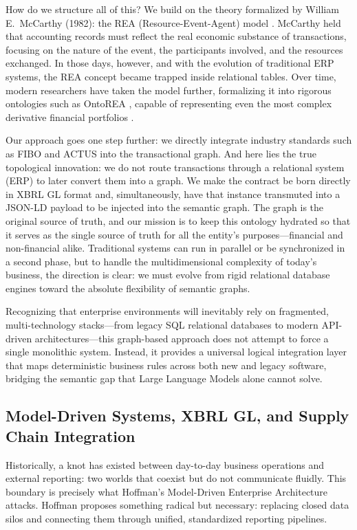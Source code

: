 \documentclass[12pt, a4paper]{article}
\begin{document}
How do we structure all of this? We build on the theory formalized by William E.~McCarthy (1982): the REA (Resource-Event-Agent) model \cite{mccarthy1982}. McCarthy held that accounting records must reflect the real economic substance of transactions, focusing on the nature of the event, the participants involved, and the resources exchanged. In those days, however, and with the evolution of traditional ERP systems, the REA concept became trapped inside relational tables. Over time, modern researchers have taken the model further, formalizing it into rigorous ontologies such as OntoREA \cite{fischerpauzenberger2017}, capable of representing even the most complex derivative financial portfolios \cite{fischerpauzenberger2018}.

Our approach goes one step further: we directly integrate industry standards such as FIBO \cite{edmc2020} and ACTUS \cite{actus2018} into the transactional graph. And here lies the true topological innovation: we do not route transactions through a relational system (ERP) to later convert them into a graph. We make the contract be born directly in XBRL GL format and, simultaneously, have that instance transmuted into a JSON-LD payload to be injected into the semantic graph. The graph is the original source of truth, and our mission is to keep this ontology hydrated so that it serves as the single source of truth for all the entity's purposes---financial and non-financial alike. Traditional systems can run in parallel or be synchronized in a second phase, but to handle the multidimensional complexity of today's business, the direction is clear: we must evolve from rigid relational database engines toward the absolute flexibility of semantic graphs.

Recognizing that enterprise environments will inevitably rely on fragmented, multi-technology stacks---from legacy SQL relational databases to modern API-driven architectures---this graph-based approach does not attempt to force a single monolithic system. Instead, it provides a universal logical integration layer that maps deterministic business rules across both new and legacy software, bridging the semantic gap that Large Language Models alone cannot solve.

\subsection{Model-Driven Systems, XBRL GL, and Supply Chain Integration}

Historically, a knot has existed between day-to-day business operations and external reporting: two worlds that coexist but do not communicate fluidly. This boundary is precisely what Hoffman's \cite{hoffman2025} Model-Driven Enterprise Architecture attacks. Hoffman proposes something radical but necessary: replacing closed data silos and connecting them through unified, standardized reporting pipelines.
\end{document}
